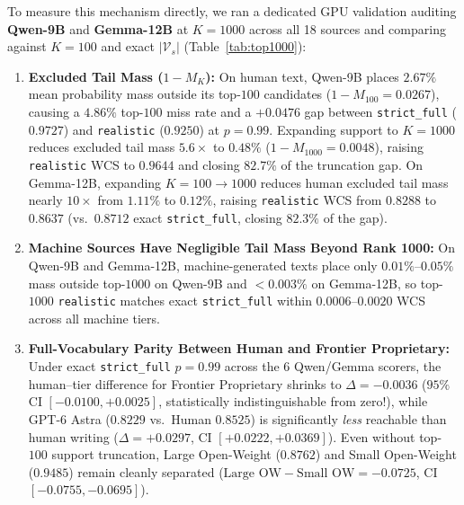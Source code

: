 \documentclass[11pt,a4paper,twocolumn]{article}
\begin{document}
To measure this mechanism directly, we ran a dedicated GPU validation auditing \textbf{Qwen-9B} and \textbf{Gemma-12B} at \textbf{$K=1000$} across all 18 sources and comparing against $K=100$ and exact $|\mathcal{V}_s|$ (Table~\ref{tab:top1000}):
\begin{enumerate}
    \item \textbf{Excluded Tail Mass ($1 - M_K$):} On human text, Qwen-9B places $2.67\%$ mean probability mass outside its top-$100$ candidates ($1 - M_{100} = 0.0267$), causing a $4.86\%$ top-$100$ miss rate and a $+0.0476$ gap between \texttt{strict\_full} ($0.9727$) and \texttt{realistic} ($0.9250$) at $p=0.99$. Expanding support to $K=1000$ reduces excluded tail mass $5.6\times$ to $0.48\%$ ($1 - M_{1000} = 0.0048$), raising \texttt{realistic} WCS to \textbf{$0.9644$} and closing \textbf{$82.7\%$} of the truncation gap. On Gemma-12B, expanding $K=100 \to 1000$ reduces human excluded tail mass nearly $10\times$ from $1.11\%$ to $0.12\%$, raising \texttt{realistic} WCS from $0.8288$ to \textbf{$0.8637$} (vs.\ $0.8712$ exact \texttt{strict\_full}, closing \textbf{$82.3\%$} of the gap).
    \item \textbf{Machine Sources Have Negligible Tail Mass Beyond Rank 1000:} On Qwen-9B and Gemma-12B, machine-generated texts place only $0.01\%$--$0.05\%$ mass outside top-$1000$ on Qwen-9B and $<0.003\%$ on Gemma-12B, so top-$1000$ \texttt{realistic} matches exact \texttt{strict\_full} within $0.0006$--$0.0020$ WCS across all machine tiers.
    \item \textbf{Full-Vocabulary Parity Between Human and Frontier Proprietary:} Under exact \texttt{strict\_full} $p=0.99$ across the 6 Qwen/Gemma scorers, the human--tier difference for Frontier Proprietary shrinks to $\Delta = -0.0036$ ($95\%$ CI $[-0.0100, +0.0025]$, statistically indistinguishable from zero!), while GPT-6 Astra ($0.8229$ vs.\ Human $0.8525$) is significantly \emph{less} reachable than human writing ($\Delta = +0.0297$, CI $[+0.0222, +0.0369]$). Even without top-$100$ support truncation, Large Open-Weight ($0.8762$) and Small Open-Weight ($0.9485$) remain cleanly separated ($\text{Large OW} - \text{Small OW} = -0.0725$, CI $[-0.0755, -0.0695]$).
\end{enumerate}
\end{document}
